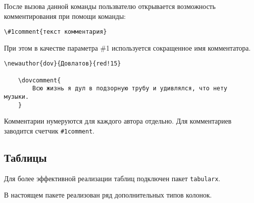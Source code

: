 После вызова данной команды пользвателю открывается возможность комментирования при помощи команды:

\begin{lstlisting}[gobble = 3]
    \#1comment{текст комментария}
\end{lstlisting}

При этом в качестве параметра \#1 используется сокращенное имя комментатора.


\begin{lstlisting}[gobble = 3]
    \newauthor{dov}{Довлатов}{red!15}

    \dovcomment{
        Всю жизнь я дул в подзорную трубу и удивлялся, что нету музыки.
    }
\end{lstlisting}

\vspace{0.2cm}


    
Комментарии нумеруются для каждого автора отдельно. Для комментариев заводится счетчик
\texttt{\#1comment}.




\subsection{Таблицы}
\label{sec:tables}

Для более эффективной реализации таблиц подключен пакет \texttt{tabularx}.


В настоящем пакете реализован ряд дополнительных типов колонок.

\vspace{0.4cm}

